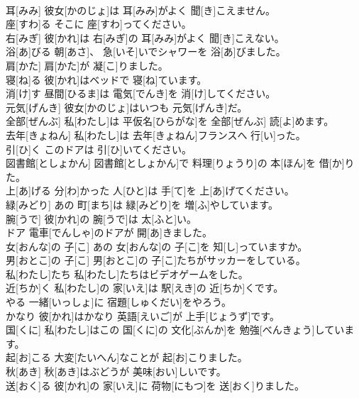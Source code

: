\documentclass[8pt]{extreport}
\begin{document}
\begin{CJK}{UTF8}{min}
\\	耳[みみ]	彼女[かのじょ]は 耳[みみ]がよく 聞[き]こえません。		
\\	座[すわ]る	そこに 座[すわ]ってください。		
\\	右[みぎ]	彼[かれ]は 右[みぎ]の 耳[みみ]がよく 聞[き]こえない。		
\\	浴[あ]びる	朝[あさ]、 急[いそ]いでシャワーを 浴[あ]びました。		
\\	肩[かた]	肩[かた]が 凝[こ]りました。		
\\	寝[ね]る	彼[かれ]はベッドで 寝[ね]ています。		
\\	消[け]す	昼間[ひるま]は 電気[でんき]を 消[け]してください。		
\\	元気[げんき]	彼女[かのじょ]はいつも 元気[げんき]だ。		
\\	全部[ぜんぶ]	私[わたし]は 平仮名[ひらがな]を 全部[ぜんぶ] 読[よ]めます。		
\\	去年[きょねん]	私[わたし]は 去年[きょねん]フランスへ 行[い]った。		
\\	引[ひ]く	このドアは 引[ひ]いてください。		
\\	図書館[としょかん]	図書館[としょかん]で 料理[りょうり]の 本[ほん]を 借[か]りた。		
\\	上[あ]げる	分[わ]かった 人[ひと]は 手[て]を 上[あ]げてください。		
\\	緑[みどり]	あの 町[まち]は 緑[みどり]を 増[ふ]やしています。		
\\	腕[うで]	彼[かれ]の 腕[うで]は 太[ふと]い。		
\\	ドア	電車[でんしゃ]のドアが 開[あ]きました。		
\\	女[おんな]の 子[こ]	あの 女[おんな]の 子[こ]を 知[し]っていますか。		
\\	男[おとこ]の 子[こ]	男[おとこ]の 子[こ]たちがサッカーをしている。		
\\	私[わたし]たち	私[わたし]たちはビデオゲームをした。		
\\	近[ちか]く	私[わたし]の 家[いえ]は 駅[えき]の 近[ちか]くです。		
\\	やる	一緒[いっしょ]に 宿題[しゅくだい]をやろう。		
\\	かなり	彼[かれ]はかなり 英語[えいご]が 上手[じょうず]です。		
\\	国[くに]	私[わたし]はこの 国[くに]の 文化[ぶんか]を 勉強[べんきょう]しています。		
\\	起[お]こる	大変[たいへん]なことが 起[お]こりました。		
\\	秋[あき]	秋[あき]はぶどうが 美味[おい]しいです。		
\\	送[おく]る	彼[かれ]の 家[いえ]に 荷物[にもつ]を 送[おく]りました。		

\end{CJK}
\end{document}
